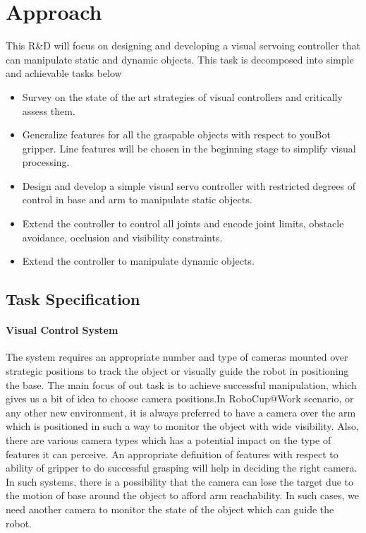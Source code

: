 \section{Approach}
 This R\&D will focus on designing and developing a visual servoing controller that can manipulate static and dynamic objects. This task is decomposed into simple and achievable
tasks below
\begin{itemize}
\item Survey on the state of the art strategies of visual controllers and critically assess them.
\item Generalize features for all the graspable objects with respect to youBot gripper. Line features will be chosen in the beginning stage to simplify 
visual processing.
\item Design and develop a simple visual servo controller with restricted degrees of control in base and arm to manipulate static objects.
\item Extend the controller to control all joints and encode joint limits, obstacle avoidance, occlusion and visibility constraints.
\item Extend the controller to manipulate dynamic objects.
\end{itemize}
\subsection{Task Specification}
\paragraph{Visual Control System}
The system requires an appropriate number and type of cameras mounted over strategic positions to track the object or visually guide the robot in positioning the base. The main
focus of out task is to achieve successful manipulation, which gives us a bit of idea to choose camera positions.In RoboCup@Work scenario, or any other new environment, it is
always preferred to have a camera over the arm which is positioned in such a way to monitor the object with wide visibility. Also, there are various camera types which has a 
potential impact on the type of features it can perceive. An appropriate definition of features with respect to ability of gripper to do successful grasping will help in deciding the right camera. In such systems, there is a possibility 
that the camera can lose the target due to the motion of base around the object to afford arm reachability. In such cases, we need another camera to monitor the state of the 
object which can guide the robot. 
